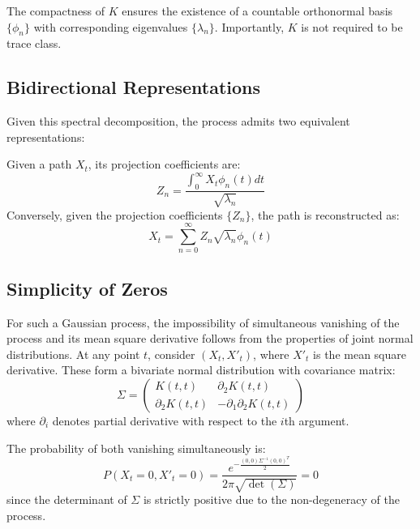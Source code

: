 \documentclass{article}
\begin{document}
The compactness of $K$ ensures the existence of a countable orthonormal basis
$\{\phi_n \}$ with corresponding eigenvalues $\{\lambda_n \}$. Importantly,
$K$ is not required to be trace class.

\subsection{Bidirectional Representations}

Given this spectral decomposition, the process admits two equivalent
representations:

Given a path $X_t$, its projection coefficients are:
\begin{equation}
  Z_n = \frac{\int_0^{\infty} X_t \phi_n (t) dt}{\sqrt{\lambda_n}}
\end{equation}
Conversely, given the projection coefficients $\{Z_n \}$, the path is
reconstructed as:
\begin{equation}
  X_t = \sum_{n = 0}^{\infty} Z_n  \sqrt{\lambda_n} \phi_n (t)
\end{equation}

\subsection{Simplicity of Zeros}

For such a Gaussian process, the impossibility of simultaneous vanishing of
the process and its mean square derivative follows from the properties of
joint normal distributions. At any point $t$, consider $(X_t, X'_t)$, where
$X'_t$ is the mean square derivative. These form a bivariate normal
distribution with covariance matrix:
\begin{equation}
  \Sigma = \left(\begin{array}{cc}
    K (t, t) & \partial_2 K (t, t)\\
    \partial_2 K (t, t) & - \partial_1 \partial_2 K (t, t)
  \end{array}\right)
\end{equation}
where $\partial_i$ denotes partial derivative with respect to the $i$th
argument.

The probability of both vanishing simultaneously is:
\begin{equation}
  P (X_t = 0, X'_t = 0) = \frac{e^{- \frac{(0, 0) \Sigma^{- 1} (0,
  0)^T}{2}}}{2 \pi \sqrt{\det (\Sigma)}} = 0
\end{equation}
since the determinant of $\Sigma$ is strictly positive due to the
non-degeneracy of the process.
\end{document}
